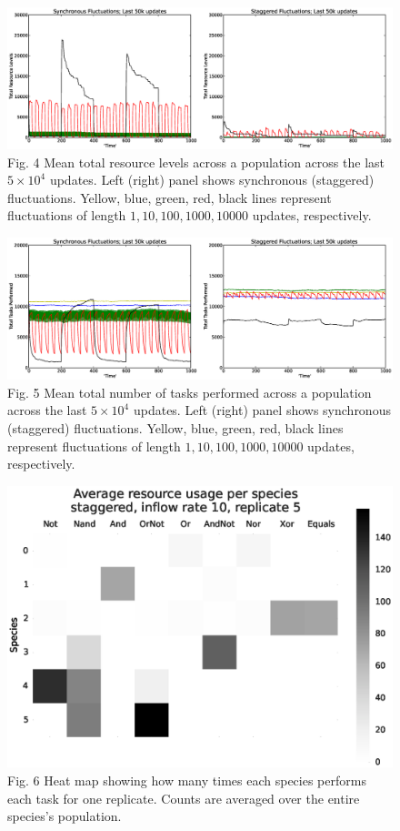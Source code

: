 \documentclass[10pt]{article}
\begin{document}
\begin{figure}[h!]
\begin{center}
\includegraphics[width=0.7\columnwidth]{figures/fig_3_total_resource_levels2/fig_3_total_resource_levels2.eps}
\caption{Fig. 4 Mean total resource levels across a population across the last $5 \times 10^4$ updates. Left (right) panel shows synchronous (staggered) fluctuations. Yellow, blue, green, red, black lines represent fluctuations of length $1,10,100,1000,10000$ updates, respectively.}
\end{center}
\end{figure}

\begin{figure}[h!]
\begin{center}
\includegraphics[width=0.7\columnwidth]{figures/fig_2_total_task_performance2/fig_2_total_task_performance2.eps}
\caption{Fig. 5 Mean total number of tasks performed across a population across the last $5 \times 10^4$ updates. Left (right) panel shows synchronous (staggered) fluctuations. Yellow, blue, green, red, black lines represent fluctuations of length $1,10,100,1000,10000$ updates, respectively.}
\end{center}
\end{figure}

\begin{figure}[h!]
\begin{center}
\includegraphics[width=0.7\columnwidth]{figures/heatmap/heatmap.eps}
\caption{Fig. 6 Heat map showing how many times each species performs each task for one replicate. Counts are averaged over the entire species's population.}
\end{center}
\end{figure}
\end{document}
